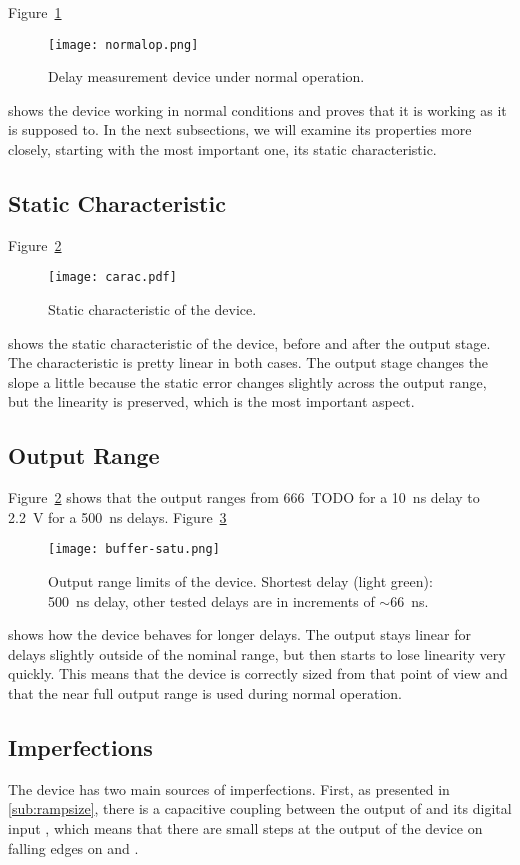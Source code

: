 Figure~\ref{fig:normalop}
\begin{figure}
  \centering
  \texttt{[image: normalop.png]}
  \caption{Delay measurement device under normal operation.\label{fig:normalop}}
\end{figure}
shows the device working in normal conditions and proves that it is working as it is supposed to.
In the next subsections, we will examine its properties more closely, starting with the most important one, its static characteristic.

\subsection{Static Characteristic}
Figure~\ref{fig:carac}
\begin{figure}
  \centering
  \texttt{[image: carac.pdf]}
  \caption{Static characteristic of the device.\label{fig:carac}}
\end{figure}
shows the static characteristic of the device, before and after the output stage. The characteristic is pretty linear in both cases.
The output stage changes the slope a little because the static error changes slightly across the output range, but the linearity is preserved, which is the most important aspect.

\subsection{Output Range}
Figure~\ref{fig:carac} shows that the output ranges from \SI{666}{TODO} for a \SI{10}{\nano\second} delay to \SI{2.2}{\volt} for a \SI{500}{\nano\second} delays.
Figure~\ref{fig:range}
\begin{figure}
  \texttt{[image: buffer-satu.png]}
  \caption[Output range limits of the device.]{Output range limits of the device. Shortest delay (light green): \SI{500}{\nano\second} delay, other tested delays are in increments of $\sim$\SI{66}{\nano\second}.\label{fig:range}}
\end{figure}
shows how the device behaves for longer delays.
The output stays linear for delays slightly outside of the nominal range, but then starts to lose linearity very quickly.
This means that the device is correctly sized from that point of view and that the near full output range is used during normal operation.

\subsection{Imperfections}
The device has two main sources of imperfections.
First, as presented in \ref{sub:rampsize}, there is a capacitive coupling between the output of  and its digital input , which means that there are small steps at the output of the device on falling edges on  and .

